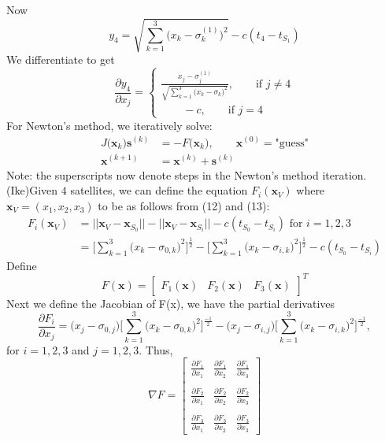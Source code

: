 \documentclass[11pt]{article}
\theoremstyle{definition}
\newcommand{\1}[1]{\mathbf{1} \left \{ #1 \right \}}
\begin{document}
Now
\begin{equation*}
    y_4 = \sqrt{\sum_{k=1}^3 \big(x_k - \sigma_k^{(1)}\big)^2} -  c(t_4 - t_{S_1})
\end{equation*}
We differentiate to get
\begin{equation*}
    \frac{\partial y_4}{\partial x_j} = \begin{cases}
    \frac{x_j - \sigma_j^{(1)}}{\sqrt{\sum_{k=1}^3 \big(x_k - \sigma_k\big)^2}}, \qquad \text{if } j \neq 4 \\
    \qquad -c, \qquad \text{if } j = 4
    \end{cases}
\end{equation*}
For Newton's method, we iteratively solve:
\begin{align*}
    J\big(\textbf{x}_k\big)\textbf{s}^{(k)} &= -F\big(\textbf{x}_k\big), \qquad \textbf{x}^{(0)} = \text{"guess"} \\
    \textbf{x}^{(k+1)} &= \textbf{x}^{(k)} + \textbf{s}^{(k)}
\end{align*}
Note: the superscripts now denote steps in the Newton's method iteration.
\\
(Ike)Given $4$ satellites, we can define the equation $F_i (\textbf{x}_V)$ where $\textbf{x}_V = (x_1, x_2, x_3)$ to be as follows from (12) and (13):
\begin{equation}
    \begin{split}
        F_i (\textbf{x}_V) &= ||\textbf{x}_V - \textbf{x}_{S_0}|| - ||\textbf{x}_V - \textbf{x}_{S_i}|| - c(t_{S_0} - t_{S_i}) \text{ for } i = 1,2,3 \\
    &= \Bigg[\sum_{k=1}^3 \big(x_k - \sigma_{0,k}\big)^2\Bigg]^\frac{1}{2} - \Bigg[\sum_{k=1}^3 \big(x_k - \sigma_{i,k}\big)^2\Bigg]^\frac{1}{2} - c(t_{S_0} - t_{S_i})
    \end{split}
\end{equation}
Define
\[F(\textbf{x}) = \begin{bmatrix}
F_1(\textbf{x}) & F_2(\textbf{x}) & F_3(\textbf{x})
\end{bmatrix}^T\]
Next we define the Jacobian of F(x), we have the partial derivatives
\begin{equation}
    \frac{\partial F_i}{\partial x_j} = \big(x_j - \sigma_{0,j}\big) \Bigg[\sum_{k=1}^3 \big(x_k - \sigma_{0,k}\big)^2\Bigg]^\frac{-1}{2} - \big(x_j - \sigma_{i,j}\big) \Bigg[\sum_{k=1}^3 \big(x_k - \sigma_{i,k}\big)^2\Bigg]^\frac{-1}{2},
\end{equation}
for $i = 1,2,3$ and $j = 1,2,3$.  Thus,
\[\nabla F = \begin{bmatrix}
\frac{\partial F_1}{\partial x_1} & \frac{\partial F_1}{\partial x_2} & \frac{\partial F_1}{\partial x_3} \\ \\
\frac{\partial F_2}{\partial x_1} & \frac{\partial F_2}{\partial x_2} & \frac{\partial F_2}{\partial x_3} \\ \\
\frac{\partial F_3}{\partial x_1} & \frac{\partial F_3}{\partial x_2} & \frac{\partial F_3}{\partial x_3}
\end{bmatrix}\]
\end{document}
